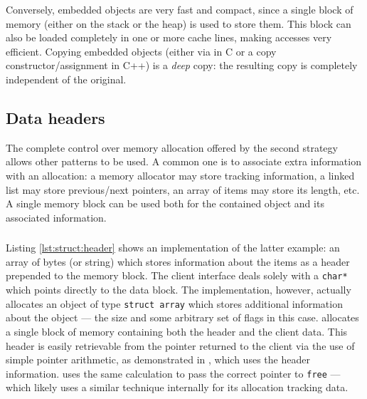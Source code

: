 Conversely, embedded objects are very fast and compact, since a single block of
memory (either on the stack or the heap) is used to store them.  This block can
also be loaded completely in one or more cache lines, making accesses very
efficient.  Copying embedded objects (either via  in C or a copy
constructor/assignment in C++) is a \textit{deep} copy: the resulting copy is
completely independent of the original.

\begin{figure}[p]
    
    
\end{figure}

\subsection{Data headers}

The complete control over memory allocation offered by the second strategy
allows other patterns to be used.  A common one is to associate extra
information with an allocation: a memory allocator may store tracking
information, a linked list may store previous/next pointers, an array of items
may store its length, etc.  A single memory block can be used both for the
contained object and its associated information.

\subsubsection{}

Listing \ref{lst:struct:header} shows an implementation of the latter example:
an array of bytes (or string) which stores information about the items as a
header prepended to the memory block.  The client interface deals solely with a
\texttt{char*} which points directly to the data block.  The implementation,
however, actually allocates an object of type \texttt{struct array} which stores
additional information about the object --- the size and some arbitrary set of
flags in this case.   allocates a single block of memory
containing both the header and the client data.  This header is easily
retrievable from the pointer returned to the client via the use of simple
pointer arithmetic, as demonstrated in , which uses the header
information.   uses the same calculation to pass the
correct pointer to \texttt{free} --- which likely uses a similar technique
internally for its allocation tracking data.

